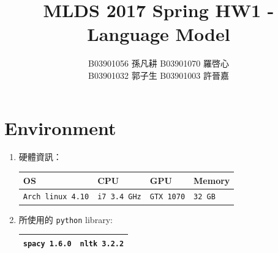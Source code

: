 \documentclass[12pt, a4paper]{article}
\title{MLDS 2017 Spring HW1 - Language Model}
\author{B03901056 孫凡耕 B03901070 羅啓心\\
        B03901032 郭子生 B03901003 許晉嘉}
\date{\vspace{-5ex}}
\theoremstyle{mystyle}	%
\begin{document}
\maketitle 
{}%
\thispagestyle{empty}
\section{Environment}
\begin{enumerate}
  \item 硬體資訊： 
    \begin{tabular}{|C{4cm}|C{3cm}|C{3cm}|C{3cm}|}
      \hline
      OS & CPU & GPU & Memory \\
      \hline
      \texttt{Arch linux 4.10} & \texttt{i7 3.4 GHz} &
      \texttt{GTX 1070}  & \texttt{32 GB}  \\
      \hline
    \end{tabular}
  \item 所使用的 \texttt{python} library:
    \begin{tabular}{|c|c|}
      \hline
      \texttt{spacy 1.6.0} & \texttt{nltk 3.2.2} \\
      \hline
    \end{tabular}
\end{enumerate}
\end{document}
